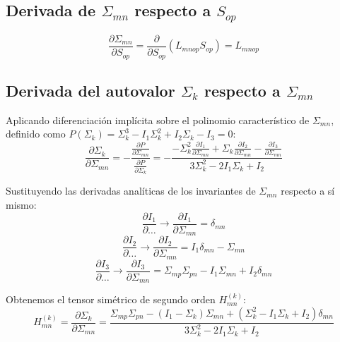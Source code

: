 \documentclass[12pt]{article}
\begin{document}
\subsection{Derivada de $\Sigma_{mn}$ respecto a $S_{op}$}
\begin{equation}
    \frac{\partial \Sigma_{mn}}{\partial S_{op}} = \frac{\partial}{\partial S_{op}} \left(L_{mnop} S_{op}\right) = L_{mnop}
\end{equation}

\subsection{Derivada del autovalor $\Sigma_k$ respecto a $\Sigma_{mn}$}
Aplicando diferenciación implícita sobre el polinomio característico de $\Sigma_{mn}$, definido como $P(\Sigma_k) = \Sigma_k^3 - I_1\Sigma_k^2 + I_2\Sigma_k - I_3 = 0$:
\begin{equation}
    \frac{\partial \Sigma_k}{\partial \Sigma_{mn}} = -\frac{\frac{\partial P}{\partial \Sigma_{mn}}}{\frac{\partial P}{\partial \Sigma_k}} = -\frac{-\Sigma_k^2 \frac{\partial I_1}{\partial \Sigma_{mn}} + \Sigma_k \frac{\partial I_2}{\partial \Sigma_{mn}} - \frac{\partial I_3}{\partial \Sigma_{mn}}}{3\Sigma_k^2 - 2I_1\Sigma_k + I_2}
\end{equation}

Sustituyendo las derivadas analíticas de los invariantes de $\Sigma_{mn}$ respecto a sí mismo:
\begin{equation}
    \frac{\partial I_1}{\partial \dots} \to \frac{\partial I_1}{\partial \Sigma_{mn}} = \delta_{mn}
\end{equation}
\begin{equation}
    \frac{\partial I_2}{\partial \dots} \to \frac{\partial I_2}{\partial \Sigma_{mn}} = I_1\delta_{mn} - \Sigma_{mn}
\end{equation}
\begin{equation}
    \frac{\partial I_3}{\partial \dots} \to \frac{\partial I_3}{\partial \Sigma_{mn}} = \Sigma_{mp}\Sigma_{pn} - I_1\Sigma_{mn} + I_2\delta_{mn}
\end{equation}

Obtenemos el tensor simétrico de segundo orden $H_{mn}^{(k)}$:
\begin{equation}
    H_{mn}^{(k)} = \frac{\partial \Sigma_k}{\partial \Sigma_{mn}} = \frac{\Sigma_{mp}\Sigma_{pn} - (I_1 - \Sigma_k)\Sigma_{mn} + (\Sigma_k^2 - I_1\Sigma_k + I_2)\delta_{mn}}{3\Sigma_k^2 - 2I_1\Sigma_k + I_2}
\end{equation}
\end{document}
